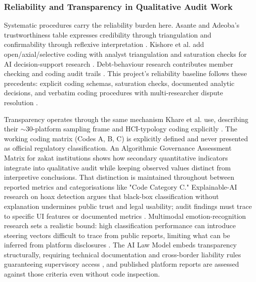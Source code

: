\documentclass[11pt]{article}
\begin{document}
\subsubsection{Reliability and Transparency in Qualitative Audit Work}
\label{sec:reliability_transparency_qual_audit} Systematic procedures carry the reliability burden here. Asante and Adeoba's trustworthiness table expresses credibility through triangulation and confirmability through reflexive interpretation \parencites[10]{8200246}[11]{8200246}. Kishore et al. add open/axial/selective coding with analyst triangulation and saturation checks for AI decision-support research \parencites[6]{4245543}. Debt-behaviour research contributes member checking and coding audit trails \parencites[8]{7042289}. This project's reliability baseline follows these precedents: explicit coding schemas, saturation checks, documented analytic decisions, and verbatim coding procedures with multi-researcher dispute resolution \parencites[4]{5716309}[5]{5716309}.

Transparency operates through the same mechanism Khare et al. use, describing their $\sim$30-platform sampling frame and HCI-typology coding explicitly \parencites[7]{6295677}. The working coding matrix (Codes A, B, C) is explicitly defined and never presented as official regulatory classification. An Algorithmic Governance Assessment Matrix for zakat institutions \parencites[59]{2702055} shows how secondary quantitative indicators integrate into qualitative audit while keeping observed values distinct from interpretive conclusions. That distinction is maintained throughout between reported metrics and categorisations like "Code Category C." Explainable-AI research on hoax detection argues that black-box classification without explanation undermines public trust and legal usability; audit findings must trace to specific UI features or documented metrics \parencites[2]{9366495}. Multimodal emotion-recognition research sets a realistic bound: high classification performance can introduce steering vectors difficult to trace from public reports, limiting what can be inferred from platform disclosures \parencites[3]{3625351}. The AI Law Model embeds transparency structurally, requiring technical documentation and cross-border liability rules guaranteeing supervisory access \parencites[107]{2977039}[111]{2977039}, and published platform reports are assessed against those criteria even without code inspection.
\end{document}
